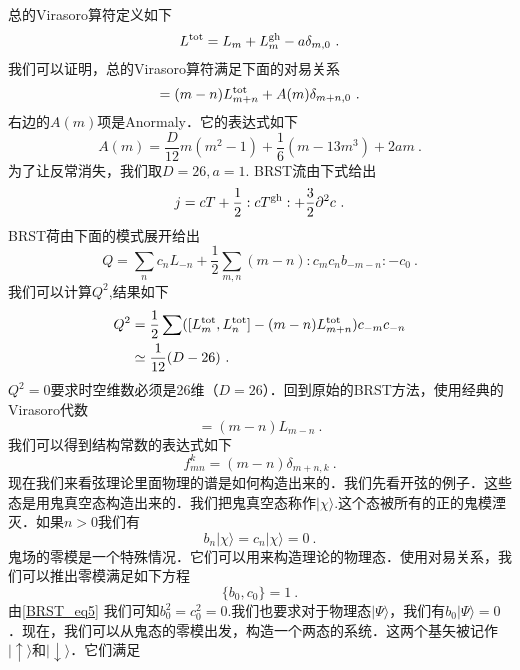 总的Virasoro算符定义如下
\begin{equation}
L^{\rm tot} = L_m + L^{\rm gh}_m - a \delta_{m,0}~.
\end{equation}
我们可以证明，总的Virasoro算符满足下面的对易关系
\begin{equation}
[L^{\rm tot}_m,L^{\rm tot}_n] = (m-n) L^{\rm tot}_{m+n} + A(m) \delta_{m+n,0}~. 
\end{equation}
右边的$A(m)$项是Anormaly．它的表达式如下
\begin{equation}
A(m) = \frac{D}{12} m (m^2-1) + \frac{1}{6} (m-13 m^3) + 2 a m~. 
\end{equation}
为了让反常消失，我们取$D=26,a=1$. BRST流由下式给出
\begin{equation}
j = c T+ \frac{1}{2} : c T^{\rm gh} : + \frac{3}{2} \partial^2 c~.
\end{equation}
BRST荷由下面的模式展开给出
\begin{equation}
Q = \sum_n c_n L_{-n} + \frac{1}{2} \sum_{m,n} (m-n) :c_m c_n b_{-m-n}: -c_0~.
\end{equation}
我们可以计算$Q^2$,结果如下
\begin{equation}
\begin{aligned}
Q^2&  = \frac{1}{2} \sum ( [L^{\rm tot}_m,L^{\rm tot}_n] - (m-n) L^{\rm tot}_{m+n} ) c_{-m} c_{-n} \\
& \simeq \frac{1}{12} (D-26)~.
\end{aligned}
\end{equation}
$Q^2=0$要求时空维数必须是26维（$D=26$）．回到原始的BRST方法，使用经典的Virasoro代数
\begin{equation}
[L_m,L_n]=(m-n)L_{m-n}~.
\end{equation}
我们可以得到结构常数的表达式如下
\begin{equation}
f^k_{mn} = (m-n) \delta_{m+n,k}~.
\end{equation}
现在我们来看弦理论里面物理的谱是如何构造出来的．我们先看开弦的例子．这些态是用鬼真空态构造出来的．我们把鬼真空态称作$|\chi\rangle$.这个态被所有的正的鬼模湮灭．如果$n>0$我们有
\begin{equation}
b_n|\chi\rangle = c_n|\chi\rangle = 0~.
\end{equation}
鬼场的零模是一个特殊情况．它们可以用来构造理论的物理态．使用对易关系，我们可以推出零模满足如下方程
\begin{equation}
\{b_0,c_0\} = 1~.
\end{equation}
由\autoref{BRST_eq5} 我们可知$b_0^2=c_0^2=0$.我们也要求对于物理态$|\Psi\rangle$，我们有$b_0|\Psi\rangle = 0$．现在，我们可以从鬼态的零模出发，构造一个两态的系统．这两个基矢被记作$|\uparrow\rangle$和$|\downarrow\rangle$．它们满足
